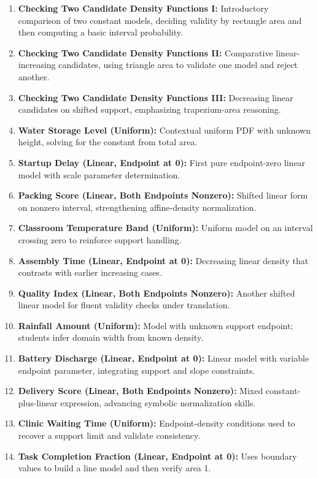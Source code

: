 \begin{enumerate}
  \item \textbf{Checking Two Candidate Density Functions I:} Introductory comparison of two constant models, deciding validity by rectangle area and then computing a basic interval probability.
  \item \textbf{Checking Two Candidate Density Functions II:} Comparative linear-increasing candidates, using triangle area to validate one model and reject another.
  \item \textbf{Checking Two Candidate Density Functions III:} Decreasing linear candidates on shifted support, emphasizing trapezium-area reasoning.
  \item \textbf{Water Storage Level (Uniform):} Contextual uniform PDF with unknown height, solving for the constant from total area.
  \item \textbf{Startup Delay (Linear, Endpoint at 0):} First pure endpoint-zero linear model with scale parameter determination.
  \item \textbf{Packing Score (Linear, Both Endpoints Nonzero):} Shifted linear form on nonzero interval, strengthening affine-density normalization.
  \item \textbf{Classroom Temperature Band (Uniform):} Uniform model on an interval crossing zero to reinforce support handling.
  \item \textbf{Assembly Time (Linear, Endpoint at 0):} Decreasing linear density that contrasts with earlier increasing cases.
  \item \textbf{Quality Index (Linear, Both Endpoints Nonzero):} Another shifted linear model for fluent validity checks under translation.
  \item \textbf{Rainfall Amount (Uniform):} Model with unknown support endpoint; students infer domain width from known density.
  \item \textbf{Battery Discharge (Linear, Endpoint at 0):} Linear model with variable endpoint parameter, integrating support and slope constraints.
  \item \textbf{Delivery Score (Linear, Both Endpoints Nonzero):} Mixed constant-plus-linear expression, advancing symbolic normalization skills.
  \item \textbf{Clinic Waiting Time (Uniform):} Endpoint-density conditions used to recover a support limit and validate consistency.
  \item \textbf{Task Completion Fraction (Linear, Endpoint at 0):} Uses boundary values to build a line model and then verify area 1.

\end{enumerate}
